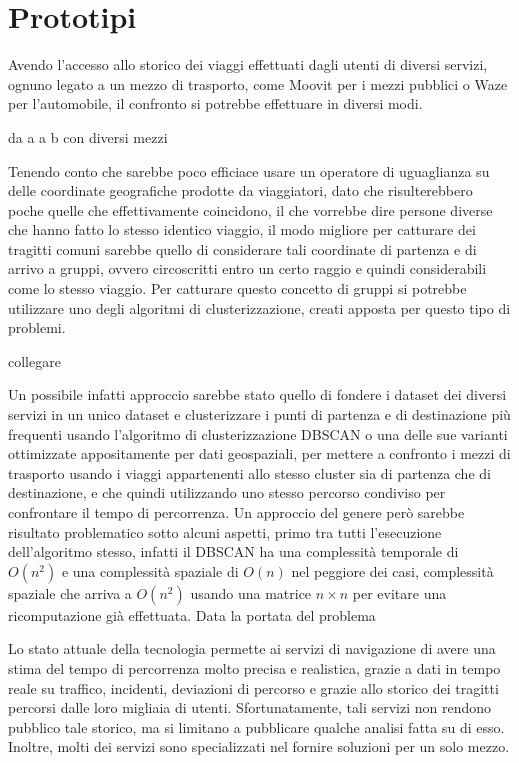 \section{Prototipi}

Avendo l'accesso allo storico dei viaggi effettuati dagli utenti di diversi servizi, ognuno legato a un mezzo di trasporto, come Moovit per i mezzi pubblici o Waze per l'automobile, il confronto si potrebbe effettuare in diversi modi.

da a a b con diversi mezzi

Tenendo conto che sarebbe poco efficiace usare un operatore di uguaglianza su delle coordinate geografiche prodotte da viaggiatori, dato che risulterebbero poche quelle che effettivamente coincidono, il che vorrebbe dire persone diverse che hanno fatto lo stesso identico viaggio, il modo migliore per catturare dei tragitti comuni sarebbe quello di considerare tali coordinate di partenza e di arrivo a gruppi, ovvero circoscritti entro un certo raggio e quindi considerabili come lo stesso viaggio. Per catturare questo concetto di gruppi si potrebbe utilizzare uno degli algoritmi di clusterizzazione, creati apposta per questo tipo di problemi.

collegare 

Un possibile infatti approccio sarebbe stato quello di fondere i dataset dei diversi servizi in un unico dataset e clusterizzare i punti di partenza e di destinazione più frequenti usando l'algoritmo di clusterizzazione DBSCAN\cite{ester1996} o una delle sue varianti ottimizzate appositamente per dati geospaziali\cite{zhou2003}\cite{borah2004}, per mettere a confronto i mezzi di trasporto usando i viaggi appartenenti allo stesso cluster sia di partenza che di destinazione, e che quindi utilizzando uno stesso percorso condiviso per confrontare il tempo di percorrenza. Un approccio del genere però sarebbe risultato problematico sotto alcuni aspetti, primo tra tutti l'esecuzione dell'algoritmo stesso, infatti il DBSCAN ha una complessità temporale di $O(n^{2})$ e una complessità spaziale di $O(n)$ nel peggiore dei casi, complessità spaziale che arriva a $O(n^2)$ usando una matrice $n \times n$ per evitare una ricomputazione già effettuata. Data la portata del problema











Lo stato attuale della tecnologia permette ai servizi di navigazione di avere una stima del tempo di percorrenza molto precisa e realistica, grazie a dati in tempo reale su traffico, incidenti, deviazioni di percorso e grazie allo storico dei tragitti percorsi dalle loro migliaia di utenti. Sfortunatamente, tali servizi non rendono pubblico tale storico, ma si limitano a pubblicare qualche analisi fatta su di esso. Inoltre, molti dei servizi sono specializzati nel fornire soluzioni per un solo mezzo.


